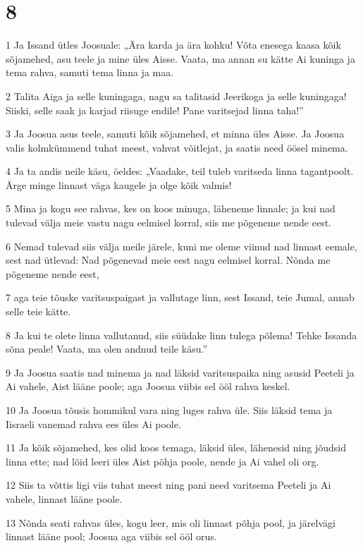 \chapter{8}

\par 1 Ja Issand ütles Joosuale: „Ära karda ja ära kohku! Võta enesega kaasa kõik sõjamehed, asu teele ja mine üles Aisse. Vaata, ma annan su kätte Ai kuninga ja tema rahva, samuti tema linna ja maa.
\par 2 Talita Aiga ja selle kuningaga, nagu sa talitasid Jeerikoga ja selle kuningaga! Siiski, selle saak ja karjad riisuge endile! Pane varitsejad linna taha!”
\par 3 Ja Joosua asus teele, samuti kõik sõjamehed, et minna üles Aisse. Ja Joosua valis kolmkümmend tuhat meest, vahvat võitlejat, ja saatis need öösel minema.
\par 4 Ja ta andis neile käsu, öeldes: „Vaadake, teil tuleb varitseda linna tagantpoolt. Ärge minge linnast väga kaugele ja olge kõik valmis!
\par 5 Mina ja kogu see rahvas, kes on koos minuga, läheneme linnale; ja kui nad tulevad välja meie vastu nagu eelmisel korral, siis me põgeneme nende eest.
\par 6 Nemad tulevad siis välja meile järele, kuni me oleme viinud nad linnast eemale, sest nad ütlevad: Nad põgenevad meie eest nagu eelmisel korral. Nõnda me põgeneme nende eest,
\par 7 aga teie tõuske varitsuspaigast ja vallutage linn, sest Issand, teie Jumal, annab selle teie kätte.
\par 8 Ja kui te olete linna vallutanud, siis süüdake linn tulega põlema! Tehke Issanda sõna peale! Vaata, ma olen andnud teile käsu.”
\par 9 Ja Joosua saatis nad minema ja nad läksid varitsuspaika ning asusid Peeteli ja Ai vahele, Aist lääne poole; aga Joosua viibis sel ööl rahva keskel.
\par 10 Ja Joosua tõusis hommikul vara ning luges rahva üle. Siis läksid tema ja Iisraeli vanemad rahva ees üles Ai poole.
\par 11 Ja kõik sõjamehed, kes olid koos temaga, läksid üles, lähenesid ning jõudsid linna ette; nad lõid leeri üles Aist põhja poole, nende ja Ai vahel oli org.
\par 12 Siis ta võttis ligi viis tuhat meest ning pani need varitsema Peeteli ja Ai vahele, linnast lääne poole.
\par 13 Nõnda seati rahvas üles, kogu leer, mis oli linnast põhja pool, ja järelvägi linnast lääne pool; Joosua aga viibis sel ööl orus.
